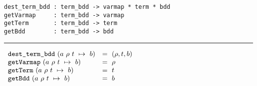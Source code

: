 \documentclass[12pt]{article}
\newlength{\minipagewidth}
\renewcommand{\t}[1]{\mbox{\tt #1}}
\newcommand{\termbdd}[4]{\mbox{$#1~#2~#3~\mapsto~#4$}}
\begin{document}
\newsavebox\destructors
\begin{lrbox}\destructors
\begin{minipage}{\minipagewidth}

\begin{footnotesize}
\begin{verbatim}
dest_term_bdd : term_bdd -> varmap * term * bdd
getVarmap     : term_bdd -> varmap
getTerm       : term_bdd -> term
getBdd        : term_bdd -> bdd
\end{verbatim}
\end{footnotesize}
\vspace*{-6mm}

\noindent \rule\minipagewidth{0.1pt}

\vspace*{1mm}

\begin{footnotesize}
\hspace*{-1.5mm}$\begin{array}{ll}
\t{dest\_term\_bdd}~(\termbdd{a}{\rho}{t}{b})&=~(\rho, t, b)\\
\t{getVarmap}~(\termbdd{a}{\rho}{t}{b})&=~\rho\\
\t{getTerm}~(\termbdd{a}{\rho}{t}{b})&=~t\\
\t{getBdd}~(\termbdd{a}{\rho}{t}{b})&=~b
\end{array}$
\end{footnotesize}
\end{minipage}
\end{lrbox}
\fbox{\usebox{\destructors}}

\bigskip

\newsavebox\inSupport
{}
\fbox{\usebox{\inSupport}}

\bigskip
\end{document}
